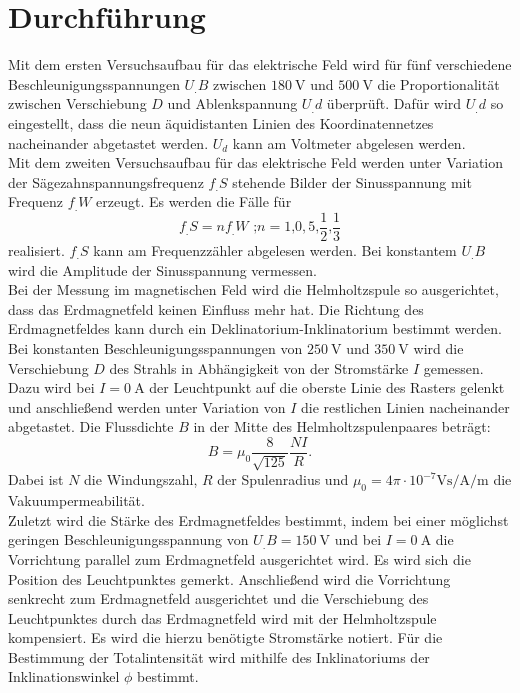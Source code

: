 
\section{Durchführung}
\label{sec:Durchführung}

Mit dem ersten Versuchsaufbau für das elektrische Feld wird für fünf verschiedene Beschleunigungsspannungen $U_.B$ zwischen $\SI{180}{\volt}$ und $\SI{500}{\volt}$ die Proportionalität zwischen Verschiebung $D$ und Ablenkspannung $U_.d$ überprüft.
Dafür wird $U_.d$ so eingestellt, dass die neun äquidistanten Linien des Koordinatennetzes nacheinander abgetastet werden. $U_d$ kann am Voltmeter abgelesen werden.\\
Mit dem zweiten Versuchsaufbau für das elektrische Feld werden unter Variation der Sägezahnspannungsfrequenz $f_.S$ stehende Bilder der Sinusspannung mit Frequenz $f_.W$ erzeugt. Es werden die Fälle für 
\[
f_.S = nf_.W \text{ ;} n=1\text{,}0,5\text{,}\frac{1}{2}\text{,}\frac{1}{3}
\]
realisiert. $f_.S$ kann am Frequenzzähler abgelesen werden. 
Bei konstantem $U_.B$ wird die Amplitude der Sinusspannung vermessen.\\
Bei der Messung im magnetischen Feld wird die Helmholtzspule so ausgerichtet, dass das Erdmagnetfeld keinen Einfluss mehr hat. Die Richtung des Erdmagnetfeldes kann durch ein Deklinatorium-Inklinatorium bestimmt werden. Bei konstanten Beschleunigungsspannungen von $\SI{250}{\volt}$ und $\SI{350}{\volt}$ wird die Verschiebung $D$ des Strahls in Abhängigkeit von der Stromstärke $I$ gemessen. Dazu wird bei $I=\SI{0}{\ampere}$ der Leuchtpunkt auf die oberste Linie des Rasters gelenkt und anschließend werden unter Variation von $I$ die restlichen Linien nacheinander abgetastet. Die Flussdichte $B$ in der Mitte des Helmholtzspulenpaares beträgt:
\begin{equation}
B = \mu_0\frac{8}{\sqrt{125}}\frac{NI}{R}\text{.}
\end{equation}
Dabei ist $N$ die Windungszahl, $R$ der Spulenradius und $\mu_0=4\pi\cdot 10^{-7}\si{\volt\second\per\ampere\per\metre}$ die Vakuumpermeabilität.\\
Zuletzt wird die Stärke des Erdmagnetfeldes bestimmt, indem bei einer möglichst geringen Beschleunigungsspannung von $U_.B = \SI{150}{\volt}$ und bei $I=\SI{0}{\ampere}$ die Vorrichtung parallel zum Erdmagnetfeld ausgerichtet wird. Es wird sich die Position des Leuchtpunktes gemerkt. Anschließend wird die Vorrichtung senkrecht zum Erdmagnetfeld ausgerichtet und die Verschiebung des Leuchtpunktes durch das Erdmagnetfeld wird mit der Helmholtzspule kompensiert. Es wird die hierzu benötigte Stromstärke notiert.
Für die Bestimmung der Totalintensität wird mithilfe des Inklinatoriums der Inklinationswinkel $\phi$ bestimmt.    